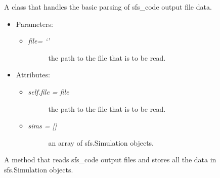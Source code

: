 \documentclass[letterpaper,10pt,english]{sphinxmanual}
\begin{document}
\begin{fulllineitems}
\label{index:sfs.SFSData}
A class that handles the basic parsing of sfs\_code output file
data.
\begin{itemize}
\item {} 
Parameters:
\begin{itemize}
\item {} \begin{description}
\item[{\emph{file= `'}}] \leavevmode
the path to the file that is to be read.

\end{description}

\end{itemize}

\item {} 
Attributes:
\begin{itemize}
\item {} \begin{description}
\item[{\emph{self.file = file}}] \leavevmode
the path to the file that is to be read.

\end{description}

\item {} \begin{description}
\item[{\emph{sims = {[}{]}}}] \leavevmode
an array of sfs.Simulation objects.

\end{description}

\end{itemize}

\end{itemize}

\begin{fulllineitems}
\label{index:sfs.SFSData.get_sims}
A method that reads sfs\_code output files and stores all the data in
sfs.Simulation objects.

\end{fulllineitems}


\end{fulllineitems}

\end{document}
